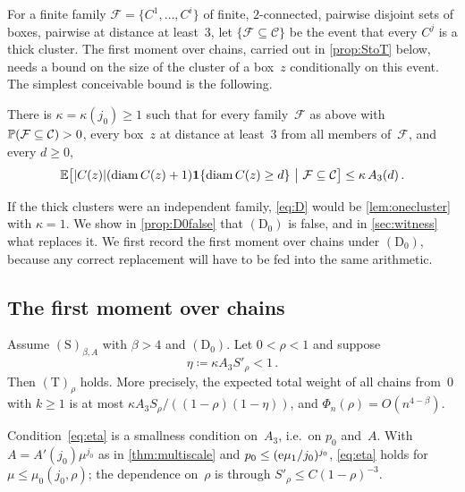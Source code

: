 \documentclass[11pt,letterpaper]{article}
\DeclareMathOperator{\diam}{diam}
\begin{document}
For a finite family $\mathcal F=\{C^1,\dots,C^i\}$ of finite, $2$-connected, pairwise disjoint sets of boxes, pairwise at distance at least~$3$, let $\{\mathcal F\subseteq\mathcal C\}$ be the event that every $C^j$ is a thick cluster. The first moment over chains, carried out in \cref{prop:StoT} below, needs a bound on the size of the cluster of a box~$z$ conditionally on this event. The simplest conceivable bound is the following.

\begin{definition}
\label{def:D0}
There is $\kappa=\kappa(j_0)\ge1$ such that for every family~$\mathcal F$ as above with $\P(\mathcal F\subseteq\mathcal C)>0$, every box~$z$ at distance at least~$3$ from all members of~$\mathcal F$, and every $d\ge0$,
\begin{equation}
\label{eq:D}
  \E\bigl[\lvert C(z)\rvert(\diam C(z)+1)\1\{\diam C(z)\ge d\}\ \big\vert\ \mathcal F\subseteq\mathcal C\bigr]\le\kappa\,A_3(d)\,.
\end{equation}
\end{definition}

If the thick clusters were an independent family, \eqref{eq:D} would be \cref{lem:onecluster} with $\kappa=1$. We show in \cref{prop:D0false} that $\mathrm{(D_0)}$ is false, and in \cref{sec:witness} what replaces it. We first record the first moment over chains under $\mathrm{(D_0)}$, because any correct replacement will have to be fed into the same arithmetic.

\subsection{The first moment over chains}

\begin{proposition}
\label{prop:StoT}
Assume $\mathrm{(S)}_{\beta,A}$ with $\beta>4$ and $\mathrm{(D_0)}$. Let $0<\rho<1$ and suppose
\begin{equation}
\label{eq:eta}
  \eta\coloneqq\kappa A_3S'_\rho<1\,.
\end{equation}
Then $\mathrm{(T)}_\rho$ holds. More precisely, the expected total weight of all chains from~$0$ with $k\ge1$ is at most $\kappa A_3S_\rho/((1-\rho)(1-\eta))$, and $\Phi_n(\rho)=O(n^{4-\beta})$.
\end{proposition}

Condition~\eqref{eq:eta} is a smallness condition on~$A_3$, i.e.\ on $p_0$ and~$A$. With $A=A'(j_0)\mu^{j_0}$ as in \cref{thm:multiscale} and $p_0\le(\e\mu_1/j_0)^{j_0}$, \eqref{eq:eta} holds for $\mu\le\mu_0(j_0,\rho)$; the dependence on~$\rho$ is through $S'_\rho\le C(1-\rho)^{-3}$.
\end{document}
